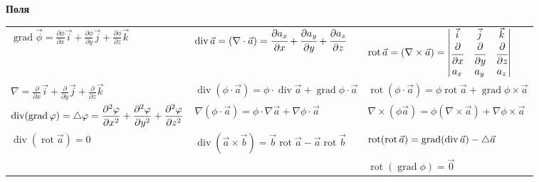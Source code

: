 \begin{center}
    \textbf{Поля}
\end{center}


\begin{tabular}{|l|l|l|}
    $\displaystyle\operatorname{grad}{\vec{\phi}} = \frac{\partial{\phi}}{\partial{x}}\vec{i}+\frac{\partial{\phi}}{\partial{y}}\vec{j}+\frac{\partial{\phi}}{\partial{z}}\vec{k}$
    &
    $\displaystyle \operatorname{div}\vec{a} = (\nabla\cdot\vec{a}) = \cfrac{\partial a_x}{\partial x} + \cfrac{\partial a_y}{\partial y}+\cfrac{\partial a_z}{\partial z}$
    & 
    $\displaystyle\operatorname{rot}\vec{a} = (\nabla\times\vec{a})=
    \begin{vmatrix}
    \vec{i} & \vec{j} & \vec{k} \\
    \cfrac{\partial}{\partial x} & \cfrac{\partial}{\partial y} &
    \cfrac{\partial}{\partial z} \\
    a_x & a_y & a_z
    \end{vmatrix}$
    \\
    
    $\displaystyle\nabla=\frac{\partial}{\partial{x}}\vec{i}+\frac{\partial}{\partial{y}}\vec{j}+\frac{\partial}{\partial{z}}\vec{k}$
    &
    $\displaystyle\operatorname{div}(\phi\cdot\vec{a}) = \phi\cdot\operatorname{div}\vec{a}+\operatorname{grad}{\phi}\cdot\vec{a}$
    & 
    $\displaystyle\operatorname{rot}(\phi\cdot\vec{a}) = \phi\operatorname{rot}\vec{a}+\operatorname{grad}\phi\times\vec{a}$
    \\
    
    $\displaystyle\operatorname{div}(\operatorname{grad}\varphi) = \mathop{}\!\mathbin\bigtriangleup\varphi = \frac{\partial^2\varphi}{\partial{x^2}} + \frac{\partial^2\varphi}{\partial{y^2}} + \frac{\partial^2\varphi}{\partial{z^2}}$
    &
    $\displaystyle\nabla{(\phi\cdot\vec{a})} = \phi\cdot\nabla\vec{a}+\nabla\phi\cdot\vec{a}$
    &
    $\displaystyle\nabla\times(\phi\vec{a}) = \phi(\nabla\times\vec{a})+\nabla\phi\times\vec{a}$
    \\
    
    $\displaystyle\operatorname{div}(\operatorname{rot}\vec{a}) = 0$
    &
    $\displaystyle\operatorname{div}(\vec{a}\times\vec{b}) = \vec{b}\operatorname{rot}\vec{a}-\vec{a}\operatorname{rot}\vec{b}$
    & 
    $\displaystyle\operatorname{rot}(\operatorname{rot}\vec{a}) = \operatorname{grad}(\operatorname{div}\vec{a}) - \mathop{}\!\mathbin\bigtriangleup\vec{a}$
    \\
    
    &
    &
    $\displaystyle\operatorname{rot}(\operatorname{grad}\phi) = \vec{0}$
    \\
\end{tabular}


